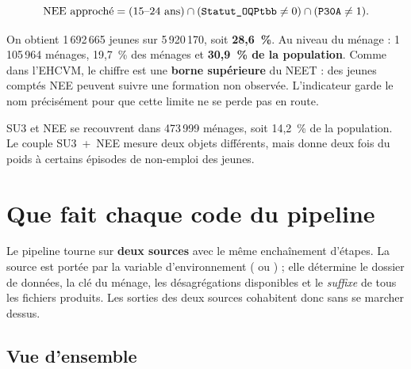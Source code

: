 \documentclass[11pt,a4paper]{article}
\begin{document}
\[
  \text{NEE approché} = (15\text{--}24\text{ ans}) \cap
  (\texttt{Statut\_OQPtbb} \neq 0) \cap (\texttt{P30A} \neq 1).
\]

On obtient 1\,692\,665 jeunes sur 5\,920\,170, soit \textbf{28,6~\%}. Au niveau du ménage :
1\,105\,964 ménages, 19,7~\% des ménages et \textbf{30,9~\% de la population}. Comme dans
l'EHCVM, le chiffre est une \textbf{borne supérieure} du NEET : des jeunes comptés NEE peuvent
suivre une formation non observée. L'indicateur garde le nom  précisément pour
que cette limite ne se perde pas en route.

SU3 et NEE se recouvrent dans 473\,999 ménages, soit 14,2~\% de la population. Le couple
SU3~+~NEE mesure deux objets différents, mais donne deux fois du poids à certains épisodes de
non-emploi des jeunes.

\section{Que fait chaque code du pipeline}

Le pipeline tourne sur \textbf{deux sources} avec le même enchaînement d'étapes. La source est
portée par la variable d'environnement  ( ou ) ; elle
détermine le dossier de données, la clé du ménage, les désagrégations disponibles et le
\emph{suffixe} de tous les fichiers produits. Les sorties des deux sources cohabitent donc sans
se marcher dessus.

\subsection{Vue d'ensemble}
\end{document}

